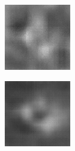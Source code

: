 \begin{figure}[H]
\begin{subfigure}[t]{0.15\textwidth}
  \end{subfigure}
  \begin{subfigure}[t]{0.15\textwidth}
    \includegraphics[width=\linewidth]{img/one-trial/prediction_2_cnnv1.png}
  \end{subfigure}
  \begin{subfigure}[t]{0.15\textwidth}
    \includegraphics[width=\linewidth]{img/one-trial/prediction_2_cnnv2.png}

\end{subfigure}
\end{figure}
